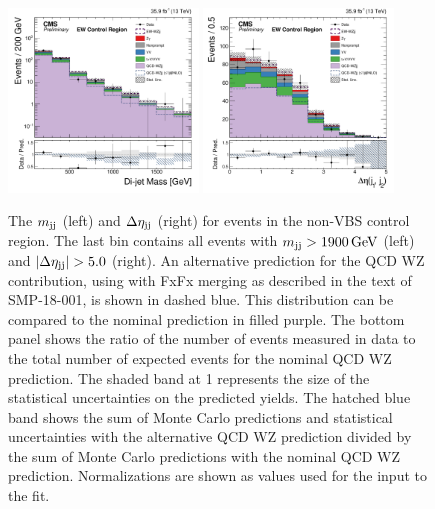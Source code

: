 \begin{figure}
\centering
\includegraphics[width=0.45\textwidth]{figures/AnalysisProcedure/mjj_backgroundControl.pdf}
\includegraphics[width=0.45\textwidth]{figures/AnalysisProcedure/dEtajj_backgroundControl.pdf}
\caption{
  The $m_{\mathrm{jj}}$ (left) and $\Delta\eta_{\mathrm{jj}}$ (right) for events in the non-VBS control region. 
  The last bin contains all events with $m_{\mathrm{jj}} > 1900\,\text{Ge\hspace{-.08em}V}$ (left) and 
  $\left|\Delta\eta_{\mathrm{jj}}\right| > 5.0$ (right).
  An alternative prediction for the 
  QCD WZ contribution, using \MG with FxFx merging as described in the text of SMP-18-001, 
  is shown in dashed blue. This distribution can be compared to the nominal prediction 
  in filled purple. The bottom panel shows the ratio of the number of events measured 
  in data to the total number of expected events for the nominal QCD WZ prediction. 
  The shaded band at 1 represents the size of the statistical uncertainties on the 
  predicted yields. The hatched blue band shows the sum of Monte Carlo 
  predictions and statistical uncertainties with the alternative QCD WZ prediction 
  divided by the sum of Monte Carlo predictions with the nominal QCD WZ prediction. 
  Normalizations are shown as values used for the input to the fit.
}
  \label{fig:backgroundControl}
\end{figure}

